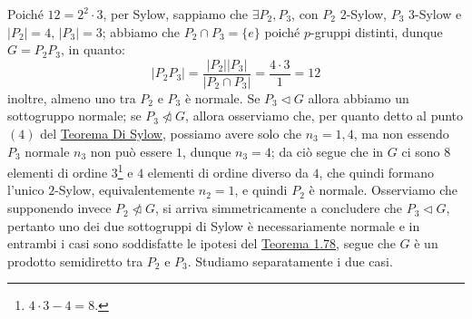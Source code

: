 \documentclass[11pt]{scrartcl}
\begin{document}
\begin{example}
    Poiché $12 = 2^2 \cdot 3$, per Sylow, sappiamo che $\exists P_2,P_3$, con $P_2$ $2$-Sylow, $P_3$ $3$-Sylow e $|P_2| = 4$, $|P_3| = 3$;
    abbiamo che $P_2 \cap P_3 = \{e\}$ poiché $p$-gruppi distinti, dunque $G = P_2P_3$, in quanto:
        \[ |P_2P_3| = \frac{|P_2||P_3|}{|P_2 \cap P_3|} = \frac{4 \cdot 3}{1} = 12
            \]
    inoltre, almeno uno tra $P_2$ e $P_3$ è normale. Se $P_3 \triangleleft G$ allora abbiamo un sottogruppo normale; se $P_3 \ntriangleleft G$, allora osserviamo che, per quanto detto al punto $(4)$
    del \hyperref[Sylow]{Teorema Di Sylow}, possiamo avere solo che $n_3 = 1,4$, ma non essendo $P_3$ normale $n_3$ non può essere $1$, dunque $n_3 = 4$;
    da ciò segue che in $G$ ci sono $8$ elementi di ordine $3$\footnote{$4 \cdot 3 - 4 = 8$.} e $4$ elementi di ordine diverso da $4$, che quindi formano 
    l'unico $2$-Sylow, equivalentemente $n_2 = 1$, e quindi $P_2$ è normale. Osserviamo che supponendo invece $P_2 \ntriangleleft G$, si arriva simmetricamente a concludere
    che $P_3 \triangleleft G$, pertanto uno dei due sottogruppi di Sylow è necessariamente normale e in entrambi i casi sono soddisfatte le ipotesi del \hyperref[t:1.78]{Teorema 1.78},
    segue che $G$ è un prodotto semidiretto tra $P_2$ e $P_3$. Studiamo separatamente i due casi.
\end{example}
\nopagebreak 
\end{document}
